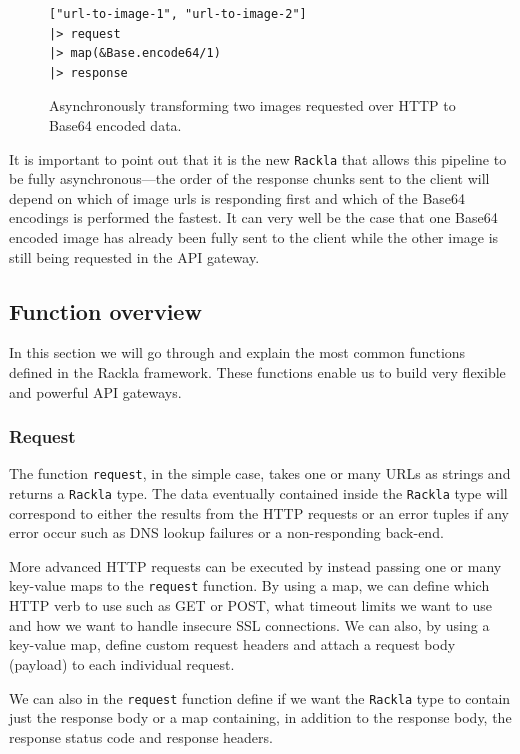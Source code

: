 \documentclass{cslthse-msc}
\begin{document}
\begin{figure}[H]
  \centering
\begin{lstlisting}[breaklines=true,frame=single]
["url-to-image-1", "url-to-image-2"]
|> request
|> map(&Base.encode64/1)
|> response
\end{lstlisting}
  \caption{Asynchronously transforming two images requested over HTTP to Base64 encoded data.}
    \label{fig:map}
\end{figure}

It is important to point out that it is the new \lstinline{Rackla} that allows this pipeline to be fully asynchronous---the order of the response chunks sent to the client will depend on which of image urls is responding first and which of the Base64 encodings is performed the fastest. It can very well be the case that one Base64 encoded image has already been fully sent to the client while the other image is still being requested in the API gateway.

\subsection{Function overview}
In this section we will go through and explain the most common functions defined in the Rackla framework. These functions enable us to build very flexible and powerful API gateways.

\subsubsection{Request}
The function \lstinline{request}, in the simple case, takes one or many URLs as strings and returns a \lstinline{Rackla} type. The data eventually contained inside the \lstinline{Rackla} type will correspond to either the results from the HTTP requests or an error tuples if any error occur such as DNS lookup failures or a non-responding back-end.

More advanced HTTP requests can be executed by instead passing one or many key-value maps to the \lstinline{request} function. By using a map, we can define which HTTP verb to use such as GET or POST, what timeout limits we want to use and how we want to handle insecure SSL connections. We can also, by using a key-value map, define custom request headers and attach a request body (payload) to each individual request.

We can also in the \lstinline{request} function define if we want the \lstinline{Rackla} type to contain just the response body or a map containing, in addition to the response body, the response status code and response headers.
\end{document}
